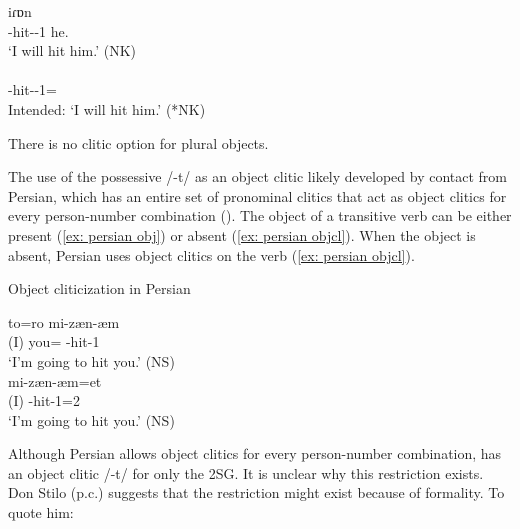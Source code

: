 \begin{exe}
	\ex \label{sent:Syntax:Clitic:General:3sg}
	\begin{xlist}
		\ex {} {iɾɒn}   
		\\
		{\fut}-hit-{\thgloss}-1{\sg} he.{\dat}
		\\
		\trans	`I {will} hit him.' \hfill   (NK)
		\\
		\ex {} 
		\\
		{\fut}-hit-{\thgloss}-1{\sg}={}
		\\
		\trans	Intended: `I  {will} hit him.' \hfill   (*NK)
		
	\end{xlist}
	
\end{exe}



There is no clitic option for   plural objects. 


The use of the possessive /{-t}/ as an object clitic likely developed by contact from Persian, which has an entire set of pronominal clitics that act as object clitics for every person-number combination (\cites[138]{Mahootian-2002-PersianGrammar}{SamvelianTseng-2010-persianObjectCliticSyntaxMorphologyInterface}). The object of a transitive verb can be either present (\ref{ex: persian obj}) or absent (\ref{ex: persian objcl}). When the object is absent,  Persian uses object clitics on the verb (\ref{ex: persian objcl}). 



\begin{exe}
	\ex Object cliticization in Persian
	\begin{xlist}
		\ex {} {to=ro} {mi-zæn-æm}
		\\
		(I) you={\om} {\impf}-hit-1{\sg}\label{ex: persian obj}
		\\ 
		\trans	`I'm going to hit you.' \hfill (NS) 
		\\ 
		\textarab{من تو رو میزنم.}
		\ex {} {mi-zæn-æm=et }
		\\
		(I)    {\impf}-hit-1{\sg}=2{\sg}
		\\
		\trans	`I'm going to hit you.'\label{ex: persian objcl}  \hfill (NS)
		\\
		\textarab{من میزنمت.}
	\end{xlist}
\end{exe}

Although Persian allows object clitics for every person-number combination, {\iaIA} has an object clitic /-t/ for only the 2SG.  It is unclear why this restriction exists. Don Stilo (p.c.) suggests that the restriction might exist because of formality. To quote him:

